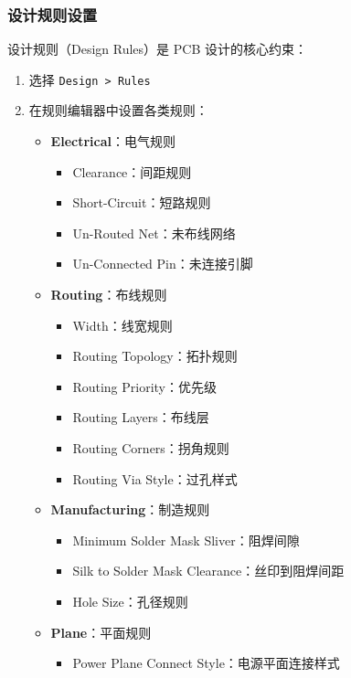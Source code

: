 \subsubsection{设计规则设置}

设计规则（Design Rules）是 PCB 设计的核心约束：


\begin{enumerate}
  \item 选择 \lstinline{Design > Rules}
  \item 在规则编辑器中设置各类规则：
    \begin{itemize}
      \item \textbf{Electrical}：电气规则
        \begin{itemize}
          \item Clearance：间距规则
          \item Short-Circuit：短路规则
          \item Un-Routed Net：未布线网络
          \item Un-Connected Pin：未连接引脚
        \end{itemize}
      \item \textbf{Routing}：布线规则
        \begin{itemize}
          \item Width：线宽规则
          \item Routing Topology：拓扑规则
          \item Routing Priority：优先级
          \item Routing Layers：布线层
          \item Routing Corners：拐角规则
          \item Routing Via Style：过孔样式
        \end{itemize}
      \item \textbf{Manufacturing}：制造规则
        \begin{itemize}
          \item Minimum Solder Mask Sliver：阻焊间隙
          \item Silk to Solder Mask Clearance：丝印到阻焊间距
          \item Hole Size：孔径规则
        \end{itemize}
      \item \textbf{Plane}：平面规则
        \begin{itemize}
          \item Power Plane Connect Style：电源平面连接样式

\end{itemize}
\end{itemize}
\end{enumerate}
